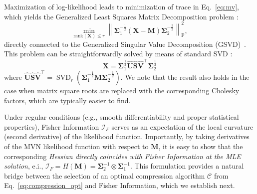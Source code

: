 \documentclass{article}
\begin{document}
Maximization of log-likelihood leads to minimization of trace in Eq.~\ref{eq:mv}, which yields the Generalized Least Squares Matrix Decomposition problem \cite{allen2014generalized}:
\begin{equation}
    \underset{\text{rank}\left(\mathbf{X}\right)\leq r}{\min} \left\| \mathbf{\Sigma}_1^{-\frac{1}{2}} (\mathbf{X} - \mathbf{M}) \mathbf{\Sigma}_2^{-\frac{1}{2}} \right\|_{\operatorname F}^2,
\end{equation}
directly connected to the Generalized Singular Value Decomposition (GSVD)~\cite{golub2013matrix}.
This problem can be straightforwardly solved by means of standard SVD \cite{abdi2007singular}:
\begin{equation}
    \mathbf{X} = \mathbf{\Sigma}_1^{\frac{1}{2}} \mathbf{\hat{U}} \mathbf{\hat{S}} \mathbf{\hat{V}}^\top \mathbf{\Sigma}_2^{\frac{1}{2}} 
\end{equation} where $\mathbf{\hat{U}} \mathbf{\hat{S}} \mathbf{\hat{V}}^\top = \operatorname{SVD}_r (\mathbf{\Sigma}_1^{-\frac{1}{2}} \mathbf{M} \mathbf{\Sigma}_2^{-\frac{1}{2}})$. We note that the result also holds in the case when matrix square roots are replaced with the corresponding Cholesky factors, which are typically easier to find. 

Under regular conditions (e.g., smooth differentiability and proper statistical properties), Fisher Information $\mathcal{I}_F$ serves as an expectation of the local curvature (second derivative) of the likelihood function. 
Importantly, by taking derivatives of the MVN likelihood function with respect to $\mathbf{M}$, it is easy to show that the corresponding \emph{Hessian directly coincides with Fisher Information at the MLE solution}, e.i., $\mathcal{I}_F=H(\mathbf{M})=\mathbf{\Sigma}^{-1}_2\otimes \mathbf{\Sigma}^{-1}_1$. 
This formulation provides a natural bridge between the selection of an optimal compression algorithm $\mathcal{C}$ from Eq.~\ref{eq:compression_opt} and Fisher Information, which we establish next.

\end{document}
